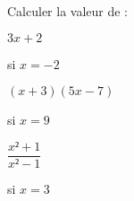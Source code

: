 \documentclass{automatisme}
\begin{document}
\begin{frame}
	Calculer la valeur de :

	\setlength{\columnseprule}{0.8pt}
	\begin{multicols}{3}
		$3x + 2$ 
		
		si $x = -2$

		\vspace*{4cm}

		\columnbreak

		$(x + 3)(5x - 7)$ 
		
		si $x = 9$

		\columnbreak

		$\dfrac{x² + 1}{x² - 1}$ 
		
		si $x = 3$
	\end{multicols}
\end{frame}
\end{document}
